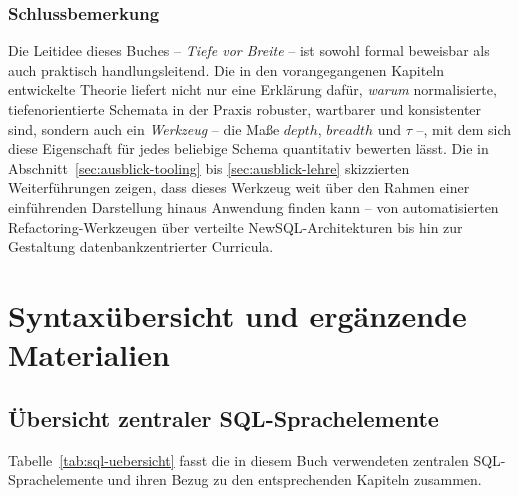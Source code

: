 ﻿\documentclass[a4paper,12pt]{report}
\theoremstyle{definition}
\theoremstyle{remark}
\newcommand{\depth}{\mathit{depth}}
\newcommand{\breadth}{\mathit{breadth}}
\begin{document}
\subsection{Schlussbemerkung}

Die Leitidee dieses Buches -- \emph{Tiefe vor Breite} -- ist sowohl
formal beweisbar als auch praktisch handlungsleitend. Die in den
vorangegangenen Kapiteln entwickelte Theorie liefert nicht nur eine
Erklärung dafür, \emph{warum} normalisierte, tiefenorientierte Schemata
in der Praxis robuster, wartbarer und konsistenter sind, sondern auch
ein \emph{Werkzeug} -- die Maße $\depth$, $\breadth$ und $\tau$ --, mit
dem sich diese Eigenschaft für jedes beliebige Schema quantitativ
bewerten lässt. Die in Abschnitt~\ref{sec:ausblick-tooling} bis
\ref{sec:ausblick-lehre} skizzierten Weiterführungen zeigen, dass dieses
Werkzeug weit über den Rahmen einer einführenden Darstellung hinaus
Anwendung finden kann -- von automatisierten Refactoring-Werkzeugen über
verteilte NewSQL-Architekturen bis hin zur Gestaltung
datenbankzentrierter Curricula.


\appendix
\chapter{Syntaxübersicht und ergänzende Materialien}

\section{Übersicht zentraler SQL-Sprachelemente}

Tabelle~\ref{tab:sql-uebersicht} fasst die in diesem Buch verwendeten
zentralen SQL-Sprachelemente und ihren Bezug zu den entsprechenden
Kapiteln zusammen.
\end{document}
